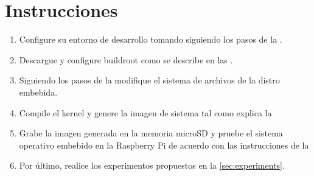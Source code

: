 %
%


\section{Instrucciones}%
\label{sec:instructions}
\begin{enumerate}[noitemsep]
	\item Configure su entorno de desarrollo tomando siguiendo los pasos de la .
	\item Descargue y configure buildroot como se describe en las .
	\item Siguiendo los pasos de la  modifique el sistema de archivos de la distro embebida.
	\item Compile el kernel y genere la imagen de sistema tal como explica la 
 	\item Grabe la imagen generada en la memoria microSD y pruebe el sistema operativo embebido en la Raspberry Pi de acuerdo con las instrucciones de la 
 	\item Por último, realice los experimentos propuestos en la \cref{sec:experiments}.
\end{enumerate}







